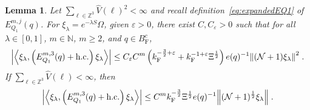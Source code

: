 \documentclass[12pt,a4paper]{article}
\numberwithin{equation}{section}
\newcommand{\NNN}{\mathbb{N}}
\newcommand{\1}{\mathbb{I}}
\newcommand{\F}{\mathrm{F}}
\newcommand{\Zstar}{\mathbb{Z}^3} %
\newcommand{\Z}{\mathbb{Z}}
\newcommand{\NN}{\mathcal{N}}
\newcommand{\half}{\frac{1}{2}}
\newcommand{\eva}[1]{\left\langle #1 \right\rangle}
\theoremstyle{plain}
\newtheorem{lemma}[theorem]{Lemma}
\theoremstyle{definition}
\theoremstyle{remark}
\theoremstyle{plain}
\theoremstyle{definition}
\theoremstyle{remark}
\begin{document}
\begin{lemma} \label{lem:EQ112}
Let $ \sum_{\ell \in \Zstar} \hat{V}(\ell)^2 < \infty $ and recall definition~\eqref{eq:expandedEQ1} of $ E_{Q_1}^{m,j}(q) $. For $\xi_\lambda = e^{-\lambda S} \Omega$, given $ \varepsilon > 0 $, there exist $ C, C_\varepsilon > 0 $ such that for all $ \lambda \in [0,1] $, $ m \in \NNN $, $ m \ge 2 $, and $ q \in B_{\F}^c $,
\begin{align} \label{eq:estEQ112_Coulomb}
	\abs{\eva{\xi_\lambda,\left(E^{m,3}_{Q_1}(q) + \mathrm{h.c.}\right) \xi_\lambda }}
	\leq C_\varepsilon C^m \left( k_{\F}^{-\frac 32 + \varepsilon}
		+ k_{\F}^{-1 + \varepsilon} \Xi^\half \right)
		e(q)^{-1}
		\norm{(\NN+1) \xi_\lambda }^2 \;.
\end{align}
If $ \sum_{\ell \in \Zstar} \hat{V}(\ell) < \infty $, then
\begin{align} \label{eq:estEQ112}
	\abs{\eva{\xi_\lambda,\left(E^{m,3}_{Q_1}(q) + \mathrm{h.c.}\right) \xi_\lambda }}
	\leq C^m k_{\F}^{-\frac{3}{2}} \Xi^{\half} e(q)^{-1}
		\norm{(\NN+1)^\half \xi_\lambda } \;.
\end{align}
\end{lemma}
\end{document}
